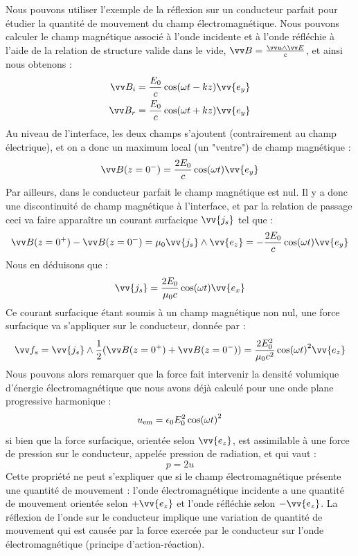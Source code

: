 \documentclass[11pt,fleqn]{book} %
\begin{document}
Nous pouvons utiliser l'exemple de la réflexion sur un conducteur parfait pour étudier la quantité de mouvement du champ électromagnétique. Nous pouvons calculer le champ magnétique associé à l'onde incidente et à l'onde réfléchie à l'aide de la relation de structure valide dans le vide, $\vv B = \frac{\vv u \wedge \vv E}{c}$, et ainsi nous obtenons :
\begin{align}
	\vv B_i = \frac{E_0}{c} \cos(\omega t - k z) \vv{e_y} \\
	\vv B_r = \frac{E_0}{c} \cos(\omega t + k z) \vv{e_y}
\end{align}
Au niveau de l'interface, les deux champs s'ajoutent (contrairement au champ électrique), et on a donc un maximum local (un "ventre") de champ magnétique :
\begin{equation}
	\vv B(z=0^-) = \frac{2 E_0}{c} \cos(\omega t) \vv{e_y}
\end{equation}
Par ailleurs, dans le conducteur parfait le champ magnétique est nul. Il y a donc une discontinuité de champ magnétique à l'interface, et par la relation de passage ceci va faire apparaître un courant surfacique $\vv{j_s}$ tel que :
\begin{equation}
	\vv B(z=0^+) - \vv B(z=0^-) = \mu_0 \vv{j_s} \wedge \vv{e_z} = -\frac{2 E_0}{c} \cos(\omega t) \vv{e_y}
\end{equation}
Nous en déduisons que :
\begin{equation}
	\vv{j_s} = \frac{2 E_0}{\mu_0 c} \cos(\omega t) \vv{e_x}
\end{equation}
Ce courant surfacique étant soumis à un champ magnétique non nul, une force surfacique va s'appliquer sur le conducteur, donnée par :
\begin{equation}
	\vv f_s = \vv{j_s} \wedge \frac{1}{2} (\vv B(z=0^+)+\vv B(z=0^-)) = \frac{2 E_0^2}{\mu_0 c^2} \cos(\omega t)^2 \vv{e_z}
\end{equation}
Nous pouvons alors remarquer que la force fait intervenir la densité volumique d'énergie électromagnétique que nous avons déjà calculé pour une onde plane progressive harmonique :
\begin{equation}
	u_{\rm em} = \epsilon_0 E_0^2 \cos(\omega t)^2
\end{equation}
si bien que la force surfacique, orientée selon $\vv{e_z}$, est assimilable à une force de pression sur le conducteur, appelée pression de radiation, et qui vaut :
\begin{equation}
	p = 2 u
\end{equation}
Cette propriété ne peut s'expliquer que si le champ électromagnétique présente une quantité de mouvement : l'onde électromagnétique incidente a une quantité de mouvement orientée selon $+ \vv{e_z}$ et l'onde réfléchie selon $-\vv{e_z}$. La réflexion de l'onde sur le conducteur implique une variation de quantité de mouvement qui est causée par la force exercée par le conducteur sur l'onde électromagnétique (principe d'action-réaction). 
\end{document}
